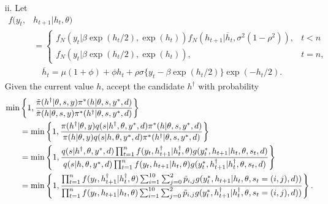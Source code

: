 \begin{itemize}
\begin{itemize}
        \item[ii.] Let
        \begin{align*}
            f(y_t, &h_{t+1}|h_t, \theta) \\
            &= 
            \begin{cases}
                f_N(y_t| \beta \exp(h_t/2), \exp(h_t)) f_N(h_{t+1}| \overline{h}_t, \sigma^2(1-\rho^2)), & t < n \\
                f_N(y_t| \beta \exp(h_t/2), \exp(h_t)), & t = n,
            \end{cases} \\
            &\quad \overline{h}_t = \mu(1+\phi) + \phi h_t + \rho \sigma \{ y_t - \beta \exp(h_t/2) \} \exp(-h_t/2).
        \end{align*}
        Given the current value $h$, accept the candidate $h^\dag$ with probability
        \begin{align*}
            \min &\left\{ 1, \frac{\Tilde{\pi}(h^\dag|\theta, s, y)\pi^*(h|\theta, s, y^*, d)}{\Tilde{\pi}(h|\theta, s, y)\pi^*(h^\dag|\theta, s, y^*, d)} \right\} \\
            &= \min \left\{ 1, \frac{\pi(h^\dag|\theta,y) q(s|h^\dag,\theta, y^*, d) \pi^*(h|\theta, s, y^*, d)}{\pi(h|\theta,y) q(s|h,\theta, y^*, d) \pi^*(h^\dag|\theta, s, y^*, d)} \right\} \\
            &= \min \left\{ 1, \frac{ q(s|h^\dag,\theta, y^*, d) \prod_{t=1}^n f(y_t, h_{t+1}^\dag| h_t^\dag, \theta) g(y_t^*, h_{t+1}| h_t, \theta, s_t, d) }{ q(s|h,\theta, y^*, d) \prod_{t=1}^n f(y_t, h_{t+1}| h_t, \theta) g(y_t^*, h_{t+1}^\dag| h_t^\dag, \theta, s_t, d) } \right\} \\
            &= \min \left\{ 1, \frac{ \prod_{t=1}^n f(y_t, h_{t+1}^\dag| h_t^\dag, \theta) \sum_{i=1}^{10}\sum_{j=0}^2 \Tilde{p}_{i,j} g(y_t^*, h_{t+1}| h_t, \theta, s_t=(i,j), d)) }{ \prod_{t=1}^n f(y_t, h_{t+1}| h_t, \theta) \sum_{i=1}^{10}\sum_{j=0}^2 \Tilde{p}_{i,j} g(y_t^*, h_{t+1}^\dag| h_t^\dag, \theta, s_t=(i,j), d)) } \right\}. \\ 
        \end{align*}
    \end{itemize}
\end{itemize}


